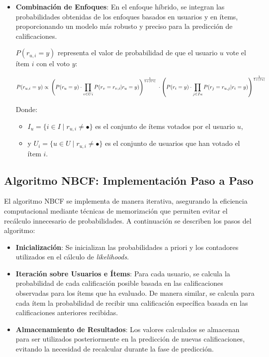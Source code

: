 \documentclass[runningheads,a4paper]{llncs}
\begin{document}
\begin{itemize}
    
    \item \textbf{Combinación de Enfoques}: 
    En el enfoque híbrido, se integran las 
    probabilidades obtenidas de los enfoques basados 
    en usuarios y en ítems, proporcionando un modelo 
    más robusto y preciso para la predicción de 
    calificaciones.

    $P(r_{u,i} = y)$ representa el valor de
    probabilidad de que el usuario $u$ vote el ítem $i$ 
    con el voto $y$:
\begin{small}
    \begin{equation}
        P(r_{u,i} = y) \propto \\ \left( P(r_u = y) \cdot \prod_{v \in Ui} P(r_v = r_{v,i} | r_u = y) \right)^{\frac{1}{1+|Ui|}} \\
        \cdot \left( P(r_i = y) \cdot \prod_{j \in Iu} P(r_j = r_{u,j} | r_i = y) \right)^{\frac{1}{1+|Iu|}}
    \end{equation} \cite{tesis_sistema_recomendador_hibrido}
    
\end{small}

    Donde:
    \begin{itemize}
        \item $I_u = \{i \in I \mid r_{u,i} \neq \bullet \}$ es el conjunto de ítems votados por el usuario $u$,
        \item y $U_i = \{u \in U \mid r_{u,i} \neq \bullet \}$ es el conjunto de usuarios que han votado el ítem $i$.
    \end{itemize} 
\end{itemize}
 

\subsection{Algoritmo NBCF: Implementación Paso a Paso}

El algoritmo NBCF se implementa de manera iterativa, 
asegurando la eficiencia computacional mediante 
técnicas de memorización que permiten evitar el 
recálculo innecesario de probabilidades. 
A continuación se describen los pasos del algoritmo:

\begin{itemize}
    \item \textbf{Inicialización}: 
    Se inicializan las probabilidades a priori y los 
    contadores utilizados en el cálculo de 
    \textit{likelihoods}.
    \item \textbf{Iteración sobre Usuarios e Ítems}: 
    Para cada usuario, se calcula la probabilidad de 
    cada calificación posible basada en las 
    calificaciones observadas para los ítems que 
    ha evaluado. De manera similar, se calcula para 
    cada ítem la probabilidad de recibir una 
    calificación específica basada en las 
    calificaciones anteriores recibidas.
    \item \textbf{Almacenamiento de Resultados}: 
    Los valores calculados se almacenan para ser 
    utilizados posteriormente en la predicción de 
    nuevas calificaciones, evitando la necesidad de 
    recalcular durante la fase de predicción.
\end{itemize}
\end{document}
